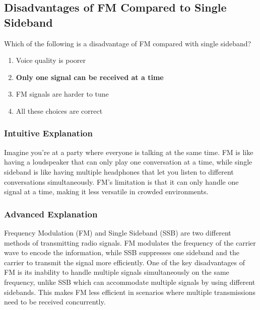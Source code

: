 \subsection{Disadvantages of FM Compared to Single Sideband}
\label{T8A12}

\begin{tcolorbox}[colback=gray!10!white,colframe=black!75!black,title=T8A12]
Which of the following is a disadvantage of FM compared with single sideband?
\begin{enumerate}[noitemsep]
    \item Voice quality is poorer
    \item \textbf{Only one signal can be received at a time}
    \item FM signals are harder to tune
    \item All these choices are correct
\end{enumerate}
\end{tcolorbox}

\subsubsection*{Intuitive Explanation}
Imagine you're at a party where everyone is talking at the same time. FM is like having a loudspeaker that can only play one conversation at a time, while single sideband is like having multiple headphones that let you listen to different conversations simultaneously. FM's limitation is that it can only handle one signal at a time, making it less versatile in crowded environments.

\subsubsection*{Advanced Explanation}
Frequency Modulation (FM) and Single Sideband (SSB) are two different methods of transmitting radio signals. FM modulates the frequency of the carrier wave to encode the information, while SSB suppresses one sideband and the carrier to transmit the signal more efficiently. One of the key disadvantages of FM is its inability to handle multiple signals simultaneously on the same frequency, unlike SSB which can accommodate multiple signals by using different sidebands. This makes FM less efficient in scenarios where multiple transmissions need to be received concurrently.